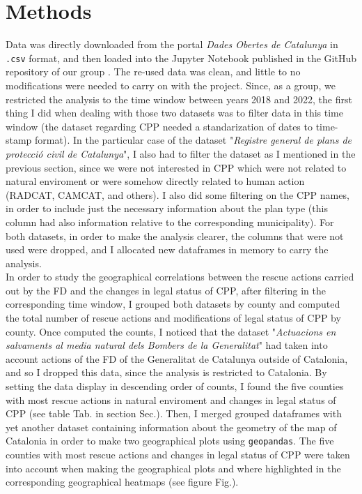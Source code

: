 \documentclass[
  journal=small,
  manuscript=mini-article,  %
  year=2023,
  volume=1,
]{odj-journal}
\begin{document}
\section{Methods}
Data was directly downloaded from the portal \textit{Dades Obertes de Catalunya} in \texttt{.csv} format, and then loaded into the Jupyter Notebook published in the GitHub repository of our group \cite{github_repo}. The re-used data was clean, and little to no modifications were needed to carry on with the project. Since, as a group, we restricted the analysis to the time window between years 2018 and 2022, the first thing I did when dealing with those two datasets was to filter data in this time window (the dataset regarding CPP needed a standarization of dates to time-stamp format). In the particular case of the dataset "\textit{Registre general de plans de protecció civil de Catalunya}", I also had to filter the dataset as I mentioned in the previous section, since we were not interested in CPP which were not related to natural enviroment or were somehow directly related to human action (RADCAT, CAMCAT, and others). I also did some filtering on the CPP names, in order to include just the necessary information about the plan type (this column had also information relative to the corresponding municipality). For both datasets, in order to make the analysis clearer, the columns that were not used were dropped, and I allocated new dataframes in memory to carry the analysis.\\

In order to study the geographical correlations between the rescue actions carried out by the FD and the changes in legal status of CPP, after filtering in the corresponding time window, I grouped both datasets by county and computed the total number of rescue actions and modifications of legal status of CPP by county. Once computed the counts, I noticed that the dataset "\textit{Actuacions en salvaments al media natural dels Bombers de la Generalitat}" had taken into account actions of the FD of the Generalitat de Catalunya outside of Catalonia, and so I dropped this data, since the analysis is restricted to Catalonia. By setting the data display in descending order of counts, I found the five counties with most rescue actions in natural enviroment and changes in legal status of CPP (see table Tab. in section Sec.). Then, I merged grouped dataframes with yet another dataset containing information about the geometry of the map of Catalonia in order to make two geographical plots using \texttt{geopandas}. The five counties with most rescue actions and changes in legal status of CPP were taken into account when making the geographical plots and where highlighted in the corresponding geographical heatmaps (see figure Fig.).\\
\end{document}

